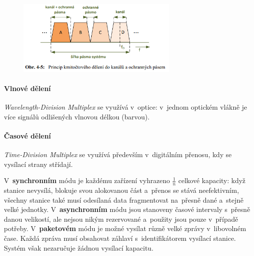 \begin{figure}[ht]
	\centering
	\includegraphics[width=0.7\textwidth]{images/q04_frequency}
\end{figure}

\paragraph{Vlnové dělení} \emph{Wavelength-Division Multiplex} se využívá v~optice: v~jednom optickém vlákně je více signálů odlišených vlnovou délkou (barvou).

\paragraph{Časové dělení} \emph{Time-Division Multiplex} se využívá především v~digitálním přenosu, kdy se vysílací strany střídají.

V~\textbf{synchronním} módu je každému zařízení vyhrazeno $\frac{1}{n}$ celkové kapacity: když stanice nevysílá, blokuje svou alokovanou část a~přenos se stává neefektivním, všechny stanice také musí odesílaná data fragmentovat na~přesně dané a~stejně velké jednotky.
V~\textbf{asynchronním} módu jsou stanoveny časové intervaly s~přesně danou velikostí, ale nejsou nikým rezervované a~použity jsou pouze v~případě potřeby.
V~\textbf{paketovém} módu je možné vysílat různě velké zprávy v~libovolném čase. Každá zpráva musí obsahovat záhlaví s~identifikátorem vysílací stanice. Systém však nezaručuje žádnou vysílací kapacitu.

